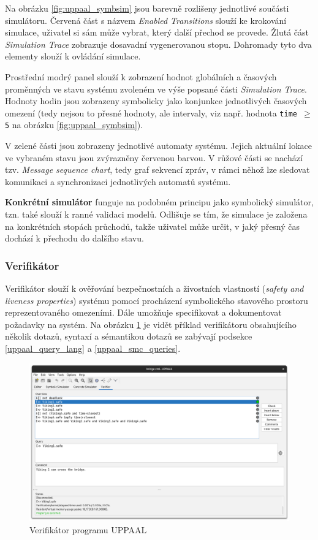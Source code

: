 Na obrázku \ref{fig:uppaal_symbsim} jsou barevně rozlišeny jednotlivé součásti simulátoru. Červená část s názvem \textit{Enabled Transitions} slouží ke krokování simulace, uživatel si sám může vybrat, který další přechod se provede. Žlutá část \textit{Simulation Trace} zobrazuje dosavadní vygenerovanou stopu. Dohromady tyto dva elementy slouží k ovládání simulace.

Prostřední modrý panel slouží k zobrazení hodnot globálních a časových proměnných ve stavu systému zvoleném ve výše popsané části \textit{Simulation Trace}. Hodnoty hodin jsou zobrazeny symbolicky jako konjunkce jednotlivých časových omezení (tedy nejsou to přesné hodnoty, ale intervaly, viz např. hodnota \texttt{time $\geq$ 5} na obrázku \ref{fig:uppaal_symbsim}).

V zelené části jsou zobrazeny jednotlivé automaty systému. Jejich aktuální lokace ve vybraném stavu jsou zvýrazněny červenou barvou. V růžové části se nachází tzv. \textit{Message sequence chart}, tedy graf sekvencí zpráv, v rámci něhož lze sledovat komunikaci a synchronizaci jednotlivých automatů systému.

\bigskip

\textbf{Konkrétní simulátor} funguje na podobném principu jako symbolický simulátor, tzn. také slouží k ranné validaci modelů. Odlišuje se tím, že simulace je založena na konkrétních stopách průchodů, takže uživatel může určit, v jaký přesný čas dochází k přechodu do dalšího stavu.

\subsubsection{Verifikátor}
Verifikátor slouží k ověřování bezpečnostních a živostních vlastností (\textit{safety and liveness properties}) systému pomocí procházení symbolického stavového prostoru reprezentovaného omezeními. Dále umožňuje specifikovat a dokumentovat požadavky na systém. Na obrázku \ref{fig:uppaal_verifier} je vidět příklad verifikátoru obsahujícího několik dotazů, syntaxí a sémantikou dotazů se zabývají podsekce \ref{uppaal_query_lang} a \ref{uppaal_smc_queries}.

\begin{figure}[H]
    \centering
    \includegraphics[width=\textwidth]{obrazky-figures/uppaal_verifier.png}
    \caption{Verifikátor programu UPPAAL}
    \label{fig:uppaal_verifier}
\end{figure}


